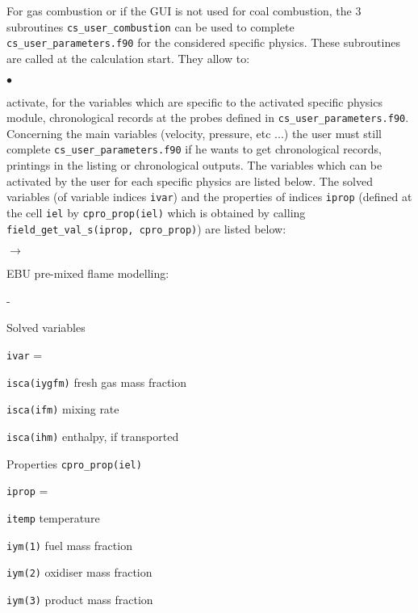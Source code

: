 {{{For gas combustion or if the GUI is not used for coal combustion, the 3
subroutines \texttt{cs\_user\_combustion} can be used to complete
\texttt{cs\_user\_parameters.f90} for the considered specific physics. These
subroutines are called at the calculation start.
They allow to:
\begin{list}{$\bullet$}{}
\item activate, for the variables which are specific to the activated specific
      physics module, chronological records at the probes defined in
      \texttt{cs\_user\_parameters.f90}.\\
      Concerning the main variables (velocity, pressure, etc ...) the user
      must still complete \texttt{cs\_user\_parameters.f90} if he wants to get
      chronological records, printings in the listing or chronological
      outputs.
      The variables which can be activated by the user for each specific
      physics are listed below. The solved variables (of variable indices
      \texttt{ivar}) and the properties of indices \texttt{iprop} (defined at
      the cell \texttt{iel} by \texttt{cpro\_prop(iel)} which is obtained
      by calling \texttt{field\_get\_val\_s(iprop, cpro\_prop)})
      are listed below:
      \begin{list}{$\rightarrow$}{}
       \item EBU pre-mixed flame modelling:
       \begin{list}{-}{}
        \item Solved variables
              \begin{list}{\texttt{ivar} = }{}
               \item \texttt{isca(iygfm)} fresh gas mass fraction
               \item \texttt{isca(ifm)} mixing rate
               \item \texttt{isca(ihm)} enthalpy, if transported
              \end{list}
        \item Properties \texttt{cpro\_prop(iel)}
              \begin{list}{\texttt{iprop} = }{}
               \item \texttt{itemp} temperature
               \item \texttt{iym(1)} fuel mass fraction
               \item \texttt{iym(2)} oxidiser mass fraction
               \item \texttt{iym(3)} product mass fraction

\end{list}
\end{list}
\end{list}
\end{list}}}}
